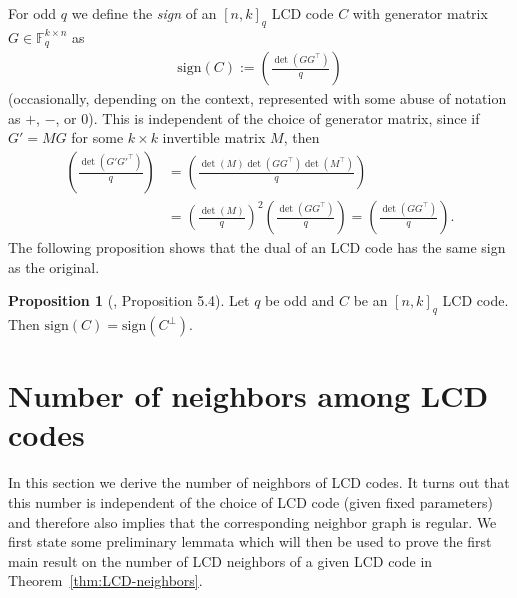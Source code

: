 \documentclass[11pt]{article}
\theoremstyle{definition}
\newtheorem{proposition}[theorem]{Proposition}
\newcommand{\F}{\mathbb{F}}
\newcommand{\Leg}[2]{\left(\frac{#1}{#2}\right)}                       %
\newcommand{\Sign}{\mathrm{sign}}
\begin{document}
For odd $q$ we define the \emph{sign} of an ${[n,k]}_q$ LCD code $C$ with generator matrix $G\in \F_q^{k\times n}$ as 
\begin{align*}
	\Sign(C) := \Leg{\det(G G^\top)}{q}
\end{align*}
(occasionally, depending on the context, represented with some abuse of notation as $+$, $-$, or $0$).
This is independent of the choice of generator matrix, since if $G' = M G$ for some $k \times k$ invertible matrix $M$, then 
\begin{align*}
	\Leg{\det(G' G'^\top)}{q}
	&= \Leg{\det(M) \det(G G^\top) \det(M^\top)}{q} \\
	&= {\Leg{\det(M)}{q}}^2 \Leg{\det(G G^\top)}{q}
	= \Leg{\det(G G^\top)}{q}.
\end{align*}
The following proposition shows that the dual of an LCD code has the same sign as the original.

\begin{proposition}[\cite{CMTQ18}, Proposition 5.4]\label{prop:dual-sign}
	Let $q$ be odd and $C$ be an ${[n,k]}_q$ LCD code.
	Then $\Sign(C) = \Sign(C^\bot)$.
\end{proposition}



\section{Number of neighbors among LCD codes}\label{sec:neighbors}

In this section we derive the number of neighbors of LCD codes.
It turns out that this number is independent of the choice of LCD code (given fixed parameters) and therefore also implies that the corresponding neighbor graph is regular.
We first state some preliminary lemmata which will then be used to prove the first main result on the number of LCD neighbors of a given LCD code in Theorem~\ref{thm:LCD-neighbors}.
\end{document}
